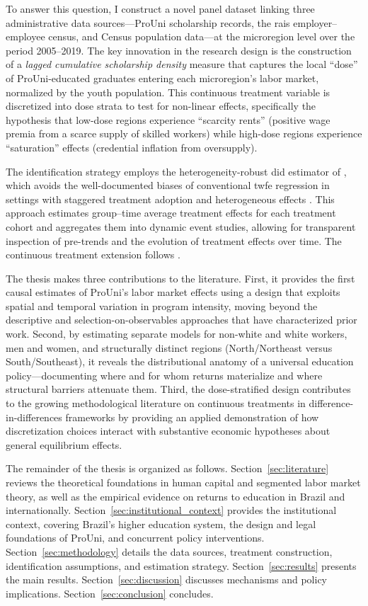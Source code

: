 To answer this question, I construct a novel panel dataset linking three administrative data sources---ProUni scholarship records, the \acrfull{rais} employer--employee census, and Census population data---at the microregion level over the period 2005--2019. The key innovation in the research design is the construction of a \emph{lagged cumulative scholarship density} measure that captures the local ``dose'' of ProUni-educated graduates entering each microregion's labor market, normalized by the youth population. This continuous treatment variable is discretized into dose strata to test for non-linear effects, specifically the hypothesis that low-dose regions experience ``scarcity rents'' (positive wage premia from a scarce supply of skilled workers) while high-dose regions experience ``saturation'' effects (credential inflation from oversupply).

The identification strategy employs the heterogeneity-robust \acrfull{did} estimator of , which avoids the well-documented biases of conventional \acrfull{twfe} regression in settings with staggered treatment adoption and heterogeneous effects \cite{GoodmanBacon2021, deChaisemartin2020}. This approach estimates group--time average treatment effects for each treatment cohort and aggregates them into dynamic event studies, allowing for transparent inspection of pre-trends and the evolution of treatment effects over time. The continuous treatment extension follows .

The thesis makes three contributions to the literature. First, it provides the first causal estimates of ProUni's labor market effects using a design that exploits spatial and temporal variation in program intensity, moving beyond the descriptive and selection-on-observables approaches that have characterized prior work. Second, by estimating separate models for non-white and white workers, men and women, and structurally distinct regions (North/Northeast versus South/Southeast), it reveals the distributional anatomy of a universal education policy---documenting where and for whom returns materialize and where structural barriers attenuate them. Third, the dose-stratified design contributes to the growing methodological literature on continuous treatments in difference-in-differences frameworks by providing an applied demonstration of how discretization choices interact with substantive economic hypotheses about general equilibrium effects.

The remainder of the thesis is organized as follows. Section~\ref{sec:literature} reviews the theoretical foundations in human capital and segmented labor market theory, as well as the empirical evidence on returns to education in Brazil and internationally. Section~\ref{sec:institutional_context} provides the institutional context, covering Brazil's higher education system, the design and legal foundations of ProUni, and concurrent policy interventions. Section~\ref{sec:methodology} details the data sources, treatment construction, identification assumptions, and estimation strategy. Section~\ref{sec:results} presents the main results. Section~\ref{sec:discussion} discusses mechanisms and policy implications. Section~\ref{sec:conclusion} concludes.
